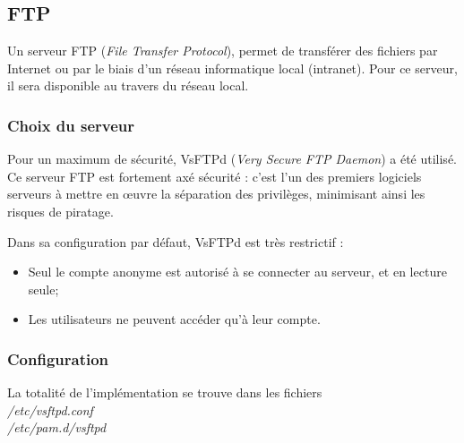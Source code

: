 \subsection{FTP}
\label{subsec:ftp}

Un serveur FTP (\emph{File Transfer Protocol}), permet de transférer des
fichiers par Internet ou par le biais d'un réseau informatique local
(intranet). Pour ce serveur, il sera disponible au travers du réseau local.

\subsubsection{Choix du serveur}
\label{subsubsec:choix-serveur}

Pour un maximum de sécurité, VsFTPd (\emph{Very Secure FTP Daemon}) a été utilisé. \\
Ce serveur FTP est fortement axé sécurité : c'est l'un des premiers logiciels
serveurs à mettre en \oe{}uvre la séparation des privilèges, minimisant ainsi les
risques de piratage.

Dans sa configuration par défaut, VsFTPd est très restrictif :

\begin{itemize}
    \item Seul le compte anonyme est autorisé à se connecter au serveur, et en
      lecture seule;

    \item Les utilisateurs ne peuvent accéder qu'à leur compte.
\end{itemize}

\subsubsection{Configuration}
\label{subsubsec:config}

La totalité de l'implémentation se trouve dans les fichiers \\
\textit{/etc/vsftpd.conf} \\
\textit{/etc/pam.d/vsftpd}

